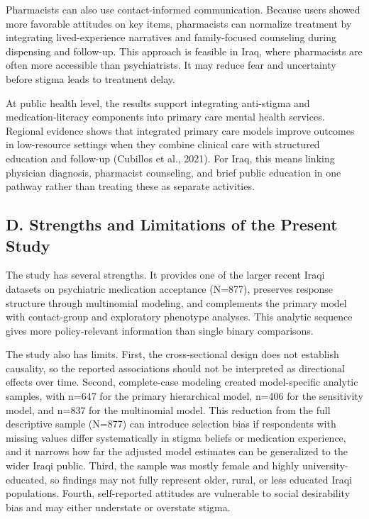 \documentclass[12pt,a4paper]{article}
\begin{document}
Pharmacists can also use contact-informed communication. Because users showed more favorable attitudes on key items, pharmacists can normalize treatment by integrating lived-experience narratives and family-focused counseling during dispensing and follow-up. This approach is feasible in Iraq, where pharmacists are often more accessible than psychiatrists. It may reduce fear and uncertainty before stigma leads to treatment delay.

At public health level, the results support integrating anti-stigma and medication-literacy components into primary care mental health services. Regional evidence shows that integrated primary care models improve outcomes in low-resource settings when they combine clinical care with structured education and follow-up (Cubillos et al., 2021). For Iraq, this means linking physician diagnosis, pharmacist counseling, and brief public education in one pathway rather than treating these as separate activities.

\subsection*{D. Strengths and Limitations of the Present Study}
The study has several strengths. It provides one of the larger recent Iraqi datasets on psychiatric medication acceptance (N=877), preserves response structure through multinomial modeling, and complements the primary model with contact-group and exploratory phenotype analyses. This analytic sequence gives more policy-relevant information than single binary comparisons.

The study also has limits. First, the cross-sectional design does not establish causality, so the reported associations should not be interpreted as directional effects over time. Second, complete-case modeling created model-specific analytic samples, with n=647 for the primary hierarchical model, n=406 for the sensitivity model, and n=837 for the multinomial model. This reduction from the full descriptive sample (N=877) can introduce selection bias if respondents with missing values differ systematically in stigma beliefs or medication experience, and it narrows how far the adjusted model estimates can be generalized to the wider Iraqi public. Third, the sample was mostly female and highly university-educated, so findings may not fully represent older, rural, or less educated Iraqi populations. Fourth, self-reported attitudes are vulnerable to social desirability bias and may either understate or overstate stigma.
\end{document}
